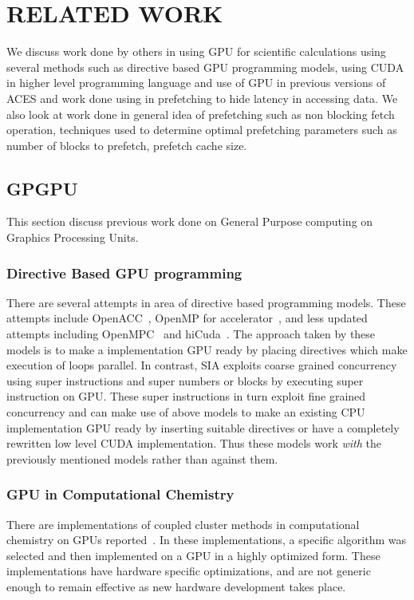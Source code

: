 \chapter{RELATED WORK}\label{lit}

We discuss work done by others in using GPU for scientific calculations using
several methods such as directive based GPU programming models, using CUDA in
higher level programming language and use of GPU in previous versions of ACES
and work done using in prefetching to hide latency in accessing data. We also look
at work done in general idea of prefetching such as non blocking fetch operation,
techniques used to determine optimal prefetching parameters such as number of
blocks to prefetch, prefetch cache size.

\section{GPGPU}
This section discuss previous work done on General Purpose computing on Graphics
Processing Units.

\subsection{Directive Based GPU programming}
There are several attempts in area of directive based programming models. These
attempts include OpenACC~\cite{openacc}, OpenMP for
accelerator~\cite{openmpforaccelerators}, and less updated attempts including
OpenMPC~\cite{openmpc} and hiCuda~\cite{hicuda}. The approach taken by these models
is to make a implementation GPU ready by placing directives which make
execution of loops parallel. In contrast, SIA exploits coarse grained
concurrency using super instructions and super numbers or blocks by executing
super instruction on GPU. These super instructions in turn exploit fine grained
concurrency and can make use of above models to make an existing CPU implementation
GPU ready by inserting suitable directives or have a completely rewritten low level
CUDA implementation. Thus these models work \textit{with} the previously mentioned
models rather than against them.

\subsection{GPU in Computational Chemistry}
There are implementations of coupled cluster methods in computational chemistry
on GPUs reported~\cite{bhaskar2013}\cite{deprince2011}\cite{maw2011}. In these
implementations, a specific algorithm was selected and then implemented on a
GPU in a highly optimized form. These implementations have hardware specific
optimizations, and are not generic enough to remain effective as new hardware
development takes place.

